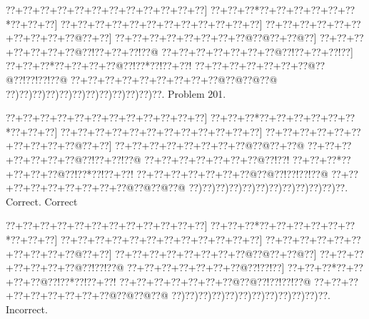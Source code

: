 \documentclass[a5paper]{article}
\begin{document}
\begin{center}
{\goo
\0??+\0??+\0??+\0??+\0??+\0??+\0??+\0??+\0??+\0??+\0??+\0??]
\0??+\0??+\0??*\0??+\0??+\0??+\0??+\0??+\0??*\0??+\0??+\0??]
\0??+\0??+\0??+\0??+\0??+\0??+\0??+\0??+\0??+\0??+\0??+\0??]
\0??+\0??+\0??+\0??+\0??+\0??+\0??+\0??+\0??+\0??@\0??+\0??]
\0??+\0??+\0??+\0??+\0??+\0??+\0??+\0??@\0??@\0??+\0??@\0??]
\0??+\0??+\0??+\0??+\0??+\0??+\0??@\0??!\0??+\0??+\0??!\0??@
\0??+\0??+\0??+\0??+\0??+\0??+\0??@\0??!\0??+\0??+\0??!\0??]
\0??+\0??+\0??*\0??+\0??+\0??+\0??@\0??!\0??*\0??!\0??+\0??!
\0??+\0??+\0??+\0??+\0??+\0??+\0??@\0??@\0??!\0??!\0??!\0??@
\0??+\0??+\0??+\0??+\0??+\0??+\0??+\0??+\0??@\0??@\0??@\0??@
\0??)\0??)\0??)\0??)\0??)\0??)\0??)\0??)\0??)\0??)\0??)\0??.
}
Problem 201.

\end{center}
\begin{center}
{\goo
\0??+\0??+\0??+\0??+\0??+\0??+\0??+\0??+\0??+\0??+\0??+\0??]
\0??+\0??+\0??*\0??+\0??+\0??+\0??+\0??+\0??*\0??+\0??+\0??]
\0??+\0??+\0??+\0??+\0??+\0??+\0??+\0??+\0??+\0??+\0??+\0??]
\0??+\0??+\0??+\0??+\0??+\0??+\0??+\0??+\0??+\0??@\0??+\0??]
\0??+\0??+\0??+\0??+\0??+\0??+\0??+\0??@\0??@\0??+\0??@
\0??+\0??+\0??+\0??+\0??+\0??+\0??@\0??!\0??+\0??!\0??@
\0??+\0??+\0??+\0??+\0??+\0??+\0??@\0??!\0??!
\0??+\0??+\0??*\0??+\0??+\0??+\0??@\0??!\0??*\0??!\0??+\0??!
\0??+\0??+\0??+\0??+\0??+\0??+\0??@\0??@\0??!\0??!\0??!\0??@
\0??+\0??+\0??+\0??+\0??+\0??+\0??+\0??+\0??@\0??@\0??@\0??@
\0??)\0??)\0??)\0??)\0??)\0??)\0??)\0??)\0??)\0??)\0??)\0??.
}
Correct. Correct

\end{center}
\begin{center}
{\goo
\0??+\0??+\0??+\0??+\0??+\0??+\0??+\0??+\0??+\0??+\0??+\0??]
\0??+\0??+\0??*\0??+\0??+\0??+\0??+\0??+\0??*\0??+\0??+\0??]
\0??+\0??+\0??+\0??+\0??+\0??+\0??+\0??+\0??+\0??+\0??+\0??]
\0??+\0??+\0??+\0??+\0??+\0??+\0??+\0??+\0??+\0??@\0??+\0??]
\0??+\0??+\0??+\0??+\0??+\0??+\0??+\0??@\0??@\0??+\0??@\0??]
\0??+\0??+\0??+\0??+\0??+\0??+\0??@\0??!\0??!\0??@
\0??+\0??+\0??+\0??+\0??+\0??+\0??@\0??!\0??!\0??]
\0??+\0??+\0??*\0??+\0??+\0??+\0??@\0??!\0??*\0??!\0??+\0??!
\0??+\0??+\0??+\0??+\0??+\0??+\0??@\0??@\0??!\0??!\0??!\0??@
\0??+\0??+\0??+\0??+\0??+\0??+\0??+\0??+\0??@\0??@\0??@\0??@
\0??)\0??)\0??)\0??)\0??)\0??)\0??)\0??)\0??)\0??)\0??)\0??.
}
Incorrect. 

\end{center}
\newpage
\end{document}
